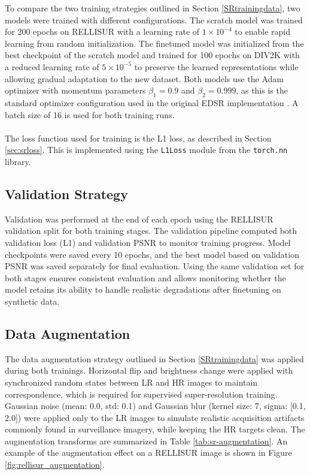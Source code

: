 \noindent To compare the two training strategies outlined in Section \ref{SRtrainingdata}, two models were trained with different configurations. The scratch model was trained for 200 epochs on \acs{RELLISUR} with a learning rate of \(1 \times 10^{-4}\) to enable rapid learning from random initialization. The finetuned model was initialized from the best checkpoint of the scratch model and trained for 100 epochs on \acs{DIV2K} with a reduced learning rate of \(5 \times 10^{-5}\) to preserve the learned representations while allowing gradual adaptation to the new dataset. Both models use the Adam optimizer with momentum parameters $\beta_1 = 0.9$ and $\beta_2 = 0.999$, as this is the standard optimizer configuration used in the original \acs{EDSR} implementation \cite{lim2017edsr}. A batch size of 16 is used for both training runs.
\\\\
The loss function used for training is the L1 loss, as described in Section \ref{sec:srloss}. This is implemented using the \texttt{L1Loss} module from the \texttt{torch.nn} library.

\subsection{Validation Strategy}
Validation was performed at the end of each epoch using the \acs{RELLISUR} validation split for both training stages. The validation pipeline computed both validation loss (L1) and validation \ac{PSNR} to monitor training progress. Model checkpoints were saved every 10 epochs, and the best model based on validation \ac{PSNR} was saved separately for final evaluation. Using the same validation set for both stages ensures consistent evaluation and allows monitoring whether the model retains its ability to handle realistic degradations after finetuning on synthetic data.


\subsection{Data Augmentation}
The data augmentation strategy outlined in Section \ref{SRtrainingdata} was applied during both trainings. Horizontal flip and brightness change were applied with synchronized random states between \acs{LR} and \acs{HR} images to maintain correspondence, which is required for supervised super-resolution training. Gaussian noise (mean: 0.0, std: 0.1) and Gaussian blur (kernel size: 7, sigma: [0.1, 2.0]) were applied only to the \acs{LR} images to simulate realistic acquisition artifacts commonly found in surveillance imagery, while keeping the \acs{HR} targets clean. The augmentation transforms are summarized in Table \ref{tab:sr-augmentation}. An example of the augmentation effect on a \acs{RELLISUR} image is shown in Figure \ref{fig:rellisur_augmentation}.

